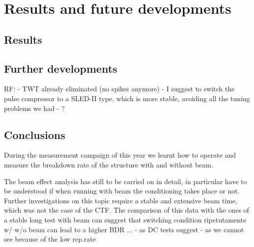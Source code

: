 \chapter[Results and future developments]{Results and future developments}

\section[Results]{Results}



\section[Further developments]{Further developments}


RF:
- TWT already eliminated (no spikes anymore)
- I suggest to switch the pulse compressor to a SLED-II type, which is more stable, avoiding all the tuning problems we had
- ?


\section{Conclusions}

During the measurement campaign of this year we learnt how to operate and measure the breakdown rate of the structure with and without beam.

The beam effect analysis has still to be carried on in detail, in particular have to be understood if when running with beam the conditioning takes place or not. Further investigations on this topic require a stable and extensive beam time, which was not the case of the CTF. The comparison of this data with the ones of a stable long test with beam can suggest that switching condition ripetutamente w/ w/o beam can lead to a higher BDR ...
- as DC tests suggest
- as we cannot see because of the low rep.rate